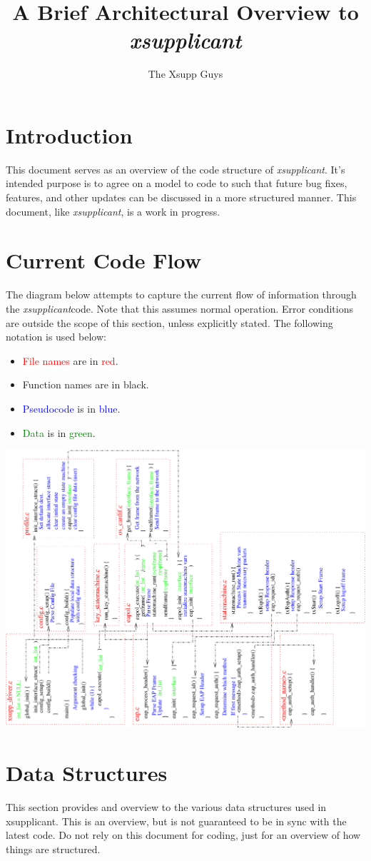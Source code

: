 \documentclass{article}
\newcommand{\xsupp}{{\em xsupplicant}}
\begin{document}
\title{A Brief Architectural Overview to \xsupp}
\author{The Xsupp Guys}

\maketitle

\section{Introduction}
This document serves as an overview of the code structure of \xsupp.
It's intended purpose is to agree on a model to code to such that future
bug fixes, features, and other updates can be discussed in a more structured 
manner. This document, like \xsupp, is a work in progress.


\section{Current Code Flow}
The diagram below attempts to capture the current flow of information
through the \xsupp code. Note that this assumes normal
operation. Error conditions are outside the scope of this section,
unless explicitly stated. The following notation is used below:
  \begin{itemize}
    \item \textcolor{red}{File names} are in \textcolor{red}{red}.
    \item Function names are in black.
    \item \textcolor{blue}{Pseudocode} is in \textcolor{blue}{blue}.
    \item \textcolor{green}{Data} is in \textcolor{green}{green}.
  \end{itemize}
  

\includegraphics[angle=-90]{current_code_flow.pdf}

\section{Data Structures}
This section provides and overview to the various data structures used in 
xsupplicant. This is an overview, but is not guaranteed to be in sync
with the latest code. Do not rely on this document for coding, just for
an overview of how things are structured.
\end{document}
